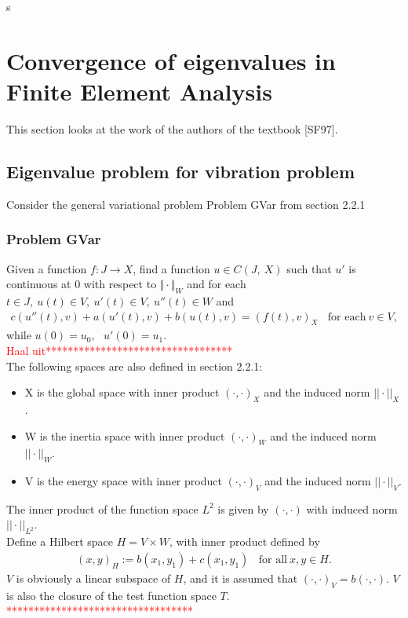 s\documentclass[../../main.tex]{subfiles}
\begin{document}
\section{Convergence of eigenvalues in Finite Element Analysis}
This section looks at the work of the authors of the textbook [SF97].

\subsection{Eigenvalue problem for vibration problem}
Consider the general variational problem Problem GVar from section 2.2.1
\subsubsection*{Problem GVar}\label{sssec:existence:ProblemGVar}
	Given a function $f:J\rightarrow X$, find a function $u\in C(J,\ X)$ such that $u'$ is continuous at $0$ with respect to $\Vert \cdot \Vert_{W}$ and for each $t\in J,\ u(t)\in V,\ u'(t) \in V,\ u''(t)\in W$ and
\begin{eqnarray}
	c(u''(t),v)+a(u'(t),v)+b(u(t),v)= (f(t),v)_{X} \ \ \ \ \textrm{for each} \ v \in V, \label{eq:existence:ProblemGVar}
\end{eqnarray}
while $u(0)=u_{0},\ \ \ u'(0)=u_{1}$.\\

\textcolor{red}{Haal uit**********************************}\\
The following spaces are also defined in section 2.2.1:
\begin{itemize}
	\item[] X is the global space with inner product $(\cdot,\cdot)_X$ and the induced norm $||\cdot||_X$.
	\item[] W is the inertia space with inner product $(\cdot,\cdot)_W$ and the induced norm $||\cdot||_W$.
	\item[] V is the energy space with inner product $(\cdot,\cdot)_V$ and the induced norm $||\cdot||_V$.
\end{itemize} The inner product of the function space $L^2$ is given by $(\cdot, \cdot)$ with induced norm $||\cdot||_{L^2}$.\\

Define a Hilbert space $H = V \times W$, with inner product defined by
\begin{eqnarray*}
	(x,y)_H := b(x_1,y_1) + c(x_1,y_1) \ \ \ \ \textrm{for all} \ x,y \in H.
\end{eqnarray*} $V$ is obviously a linear subspace of $H$, and it is assumed that $(\cdot,\cdot)_V  = b(\cdot,\cdot)$. $V$ is also the closure of the test function space $T$.\\
\textcolor{red}{**********************************}\\
\end{document}
